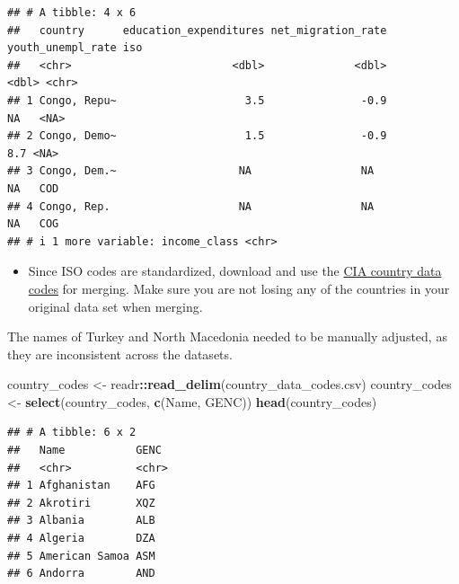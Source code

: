 \documentclass[
]{article}
\newenvironment{Shaded}{\begin{snugshade}}{\end{snugshade}}
\newcommand{\FunctionTok}[1]{\textcolor[rgb]{0.13,0.29,0.53}{\textbf{#1}}}
\newcommand{\NormalTok}[1]{#1}
\newcommand{\OtherTok}[1]{\textcolor[rgb]{0.56,0.35,0.01}{#1}}
\newcommand{\SpecialCharTok}[1]{\textcolor[rgb]{0.81,0.36,0.00}{\textbf{#1}}}
\newcommand{\StringTok}[1]{\textcolor[rgb]{0.31,0.60,0.02}{#1}}
\providecommand{\tightlist}{%
  \setlength{\itemsep}{0pt}\setlength{\parskip}{0pt}}
\begin{document}
\begin{verbatim}
## # A tibble: 4 x 6
##   country      education_expenditures net_migration_rate youth_unempl_rate iso  
##   <chr>                         <dbl>              <dbl>             <dbl> <chr>
## 1 Congo, Repu~                    3.5               -0.9              NA   <NA> 
## 2 Congo, Demo~                    1.5               -0.9               8.7 <NA> 
## 3 Congo, Dem.~                   NA                 NA                NA   COD  
## 4 Congo, Rep.                    NA                 NA                NA   COG  
## # i 1 more variable: income_class <chr>
\end{verbatim}

\begin{itemize}
\tightlist
\item
  Since ISO codes are standardized, download and use the
  \href{https://www.cia.gov/the-world-factbook/references/country-data-codes/}{CIA
  country data codes} for merging. Make sure you are not losing any of
  the countries in your original data set when merging.
\end{itemize}

The names of Turkey and North Macedonia needed to be manually adjusted,
as they are inconsistent across the datasets.

\begin{Shaded}
\begin{Highlighting}[]
\NormalTok{country\_codes }\OtherTok{\textless{}{-}}\NormalTok{ readr}\SpecialCharTok{::}\FunctionTok{read\_delim}\NormalTok{(}\StringTok{\textquotesingle{}country\_data\_codes.csv\textquotesingle{}}\NormalTok{)}
\NormalTok{country\_codes }\OtherTok{\textless{}{-}} \FunctionTok{select}\NormalTok{(country\_codes, }\FunctionTok{c}\NormalTok{(Name, GENC))}
\FunctionTok{head}\NormalTok{(country\_codes)}
\end{Highlighting}
\end{Shaded}

\begin{verbatim}
## # A tibble: 6 x 2
##   Name           GENC 
##   <chr>          <chr>
## 1 Afghanistan    AFG  
## 2 Akrotiri       XQZ  
## 3 Albania        ALB  
## 4 Algeria        DZA  
## 5 American Samoa ASM  
## 6 Andorra        AND
\end{verbatim}
\end{document}
